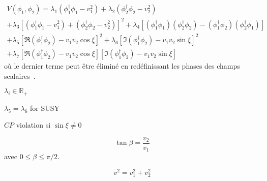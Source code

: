\begin{multline}
V(\phi_1,\phi_2)
= \lambda_1 (\phi_1^\dagger\phi_1-v_1^2)
+ \lambda_2 (\phi_2^\dagger\phi_2-v_2^2)
\\
+ \lambda_3 \left[ (\phi_1^\dagger\phi_1-v_1^2) + (\phi_2^\dagger\phi_2-v_2^2) \right]^2
+ \lambda_4 \left[ (\phi_1^\dagger\phi_1)(\phi_2^\dagger\phi_2) - (\phi_1^\dagger\phi_2)(\phi_2^\dagger\phi_1) \right]
\\
+ \lambda_5 \left[ \Re(\phi_1^\dagger\phi_2) -v_1v_2\cos\xi \right]^2
+ \lambda_6 \left[ \Im(\phi_1^\dagger\phi_2) -v_1v_2\sin\xi \right]^2
\\
+ \lambda_7 \left[ \Re(\phi_1^\dagger\phi_2) -v_1v_2\cos\xi \right]\left[ \Im(\phi_1^\dagger\phi_2) -v_1v_2\sin\xi \right]
\end{multline}
où le dernier terme peut être éliminé en redéfinissant les phases des champs scalaires~\cite{Higgs_hunter_guide_errata}.

$\lambda_i\in\mathbb{R}_+$

$\lambda_5=\lambda_6$ for SUSY

$CP$ violation si $\sin\xi\neq0$

\begin{equation}
\tan\beta = \frac{v_2}{v_1}
\end{equation}
avec $0\leq\beta\leq\pi/2$.

\begin{equation}
v^2 = v_1^2+v_2^2
\end{equation}

